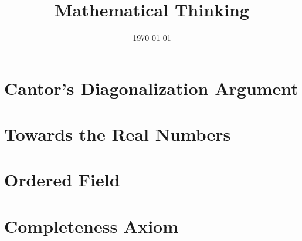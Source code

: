 \documentclass[12pt]{amsart}
\title{Mathematical Thinking}
\date{\today}
\begin{document}
\maketitle
\tableofcontents
\section{Cantor's Diagonalization Argument}
\section{Towards the Real Numbers}
\section{Ordered Field}
\section{Completeness Axiom}
\end{document}
